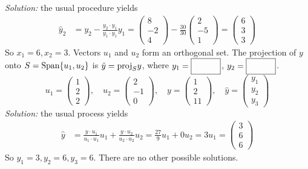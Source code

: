     \ifnum {} {\color{DarkBlue} \textit{Solution:} the usual procedure yields
    \begin{align}
        \hat y_2 
        &= y_2 - \frac{y_2\cdot y_1}{y_1 \cdot y_1}y_1 
        = \begin{pmatrix} 8\\-2\\4\end{pmatrix} - \frac{30}{30}\begin{pmatrix} 2\\-5\\1\end{pmatrix} 
        = \begin{pmatrix} 6\\3\\3\end{pmatrix}
    \end{align}
    So $x_1=6, x_2=3$. 
    } \fi    
\fi 
\ifnum {}
    Vectors $u_1$ and $u_2$ form an orthogonal set. The projection of $y$ onto $S=\text{Span}\{u_1,u_2\}$ is $\hat y = \text{proj}_Sy$, where $y_1=\framebox{\strut\hspace{1cm}}$, 
    $y_2=\framebox{\strut\hspace{1cm}}$. $$u_1 = \begin{pmatrix} 1\\2\\2\end{pmatrix}, \quad u_2 = \begin{pmatrix} 2\\-1\\0\end{pmatrix}, \quad y = \begin{pmatrix} 1\\2\\11\end{pmatrix}, \quad \hat y = \begin{pmatrix} y_1\\y_2\\y_3\end{pmatrix}$$
    \ifnum {} {\color{DarkBlue} \textit{Solution:} the usual process yields
    \begin{align}
        \hat y &= \frac{y\cdot u_1}{u_1 \cdot u_1}u_1 + \frac{y\cdot u_2}{u_2 \cdot u_2}u_2 
        = \frac{27}{9}u_1 + 0u_2 = 3u_1 
        = \begin{pmatrix} 3\\6\\ 6\end{pmatrix} 
    \end{align}
    So $y_1=3, y_2=6, y_3=6$. There are no other possible solutions. } \fi  
